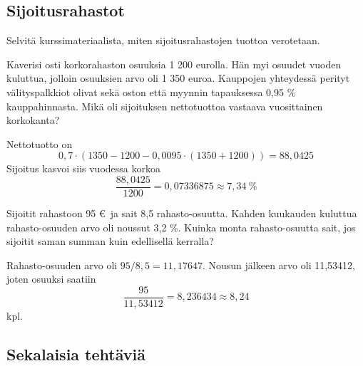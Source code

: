 \documentclass{article}\usepackage[]{graphicx}\usepackage[]{color}
\begin{document}
\subsection*{Sijoitusrahastot}

\begin{question} Selvitä kurssimateriaalista, miten sijoitusrahastojen tuottoa verotetaan.

\end{question}

\begin{question} 
    Kaverisi osti korkorahaston osuuksia 1 200 eurolla. Hän myi osuudet vuoden kuluttua, jolloin osuuksien arvo oli 1 350 euroa. Kauppojen yhteydessä perityt välityspalkkiot olivat sekä oston että myynnin tapauksessa 0{,}95 \% kauppahinnasta. Mikä oli sijoituksen nettotuottoa vastaava vuosittainen korkokanta?
\end{question}
\begin{solution}
    Nettotuotto on 
    \[
        0,7\cdot(1350 - 1200 - 0,0095\cdot(1350+1200)) = 88{,}0425
    \]
    Sijoitus kasvoi siis vuodessa korkoa
    \[
        \frac{88{,}0425}{1200} = 0{,}07336875 \approx 7{,}34~\%
    \]
\end{solution}

\begin{question} 
    Sijoitit rahastoon 95 \euro\ ja sait 8{,}5 rahasto-osuutta. Kahden kuukauden kuluttua rahasto-osuuden arvo oli noussut 3{,}2 \%. Kuinka monta rahasto-osuutta sait, jos sijoitit saman summan kuin edellisellä kerralla?
\end{question}
\begin{solution}
    Rahasto-osuuden arvo oli \(95/8,5 = 11{,}17647\). Nousun jälkeen arvo oli 11{,}53412, joten osuuksi saatiin
    \[
        \frac{95}{11{,}53412} = 8{,}236434 \approx 8{,}24
    \]
    kpl.
\end{solution}

\subsection*{Sekalaisia tehtäviä}
\end{document}
